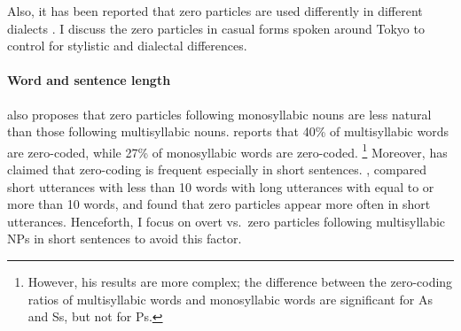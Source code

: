 %
%
Also, it has been reported that
zero particles are used differently in different dialects \cite[e.g.,][]{sasaki06,nakagawa13m}.
%
I discuss the zero particles in casual forms spoken around Tokyo
to control for stylistic and dialectal differences.

\paragraph{Word and sentence length}

 also proposes that
zero particles following monosyllabic nouns are less natural than
those following multisyllabic nouns.
%
 reports that
40\% of multisyllabic words are zero-coded,
while 27\% of monosyllabic words are zero-coded.%
 \footnote{
 However, his results are more complex;
 the difference between the zero-coding ratios of multisyllabic words
 and monosyllabic words are significant for As and Ss, but not for Ps.
 }
Moreover,
 has claimed that
zero-coding is frequent especially in short sentences.
,
compared short utterances with less than 10 words with
long utterances with equal to or more than 10 words, and
found that zero particles appear more often in short utterances.
%
Henceforth, I focus on overt vs.~zero particles following multisyllabic NPs in short sentences to avoid this factor.


